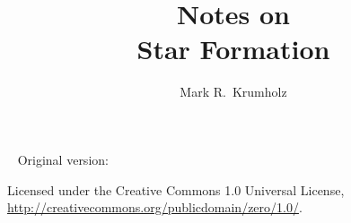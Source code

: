 \documentclass{tex/tufte-book} %
\title{Notes on\\Star Formation} %
\author{Mark R.~Krumholz} %
\newcommand{\monthyear}{\ifcase\month\or January\or February\or March\or April\or May\or June\or July\or August\or September\or October\or November\or December\fi\space\number\year} %
\newcommand{\openepigraph}[2]{ %
\begin{fullwidth}
\sffamily\large
\begin{doublespace}
\noindent\allcaps{#1}\\ %
\noindent\allcaps{#2} %
\end{doublespace}
\end{fullwidth}
}
\begin{document}
\frontmatter


\thispagestyle{empty}


\maketitle %


\newpage
\begin{fullwidth}
~\vfill
\thispagestyle{empty}
\setlength{\parindent}{0pt}
\setlength{\parskip}{\baselineskip}
Original version: \the\year\ \thanklessauthor

\par{}

\par{}

\par Licensed under the Creative Commons 1.0 Universal License, \url{http://creativecommons.org/publicdomain/zero/1.0/}.

\end{fullwidth}


\tableofcontents %


\listoffigures %

\end{document}
